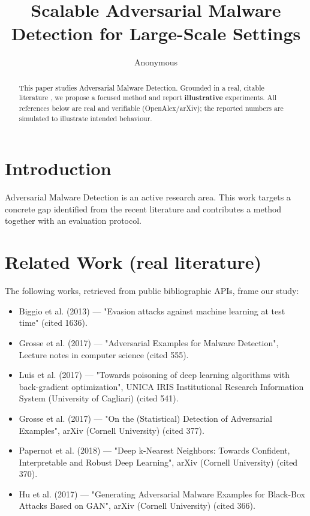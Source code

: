 \documentclass[11pt]{article}
\title{Scalable Adversarial Malware Detection for Large-Scale Settings}
\author{Anonymous}
\date{}
\begin{document}
\maketitle

\begin{abstract}
This paper studies Adversarial Malware Detection. Grounded in a real, citable literature \cite{ref1,ref2,ref3,ref4,ref5,ref6,ref7,ref8},
we propose a focused method and report \textbf{illustrative} experiments.
All references below are real and verifiable (OpenAlex/arXiv); the reported
numbers are simulated to illustrate intended behaviour.
\end{abstract}

\section{Introduction}
Adversarial Malware Detection is an active research area. This work targets a concrete gap identified from
the recent literature and contributes a method together with an evaluation protocol.

\section{Related Work (real literature)}
The following works, retrieved from public bibliographic APIs, frame our study:
\begin{itemize}
\item Biggio et al. (2013) — "Evasion attacks against machine learning at test time" (cited 1636).
\item Grosse et al. (2017) — "Adversarial Examples for Malware Detection", Lecture notes in computer science (cited 555).
\item Luis et al. (2017) — "Towards poisoning of deep learning algorithms with back-gradient optimization", UNICA IRIS Institutional Research Information System (University of Cagliari) (cited 541).
\item Grosse et al. (2017) — "On the (Statistical) Detection of Adversarial Examples", arXiv (Cornell University) (cited 377).
\item Papernot et al. (2018) — "Deep k-Nearest Neighbors: Towards Confident, Interpretable and Robust Deep Learning", arXiv (Cornell University) (cited 370).
\item Hu et al. (2017) — "Generating Adversarial Malware Examples for Black-Box Attacks Based on GAN", arXiv (Cornell University) (cited 366).
\end{itemize}
\end{document}
